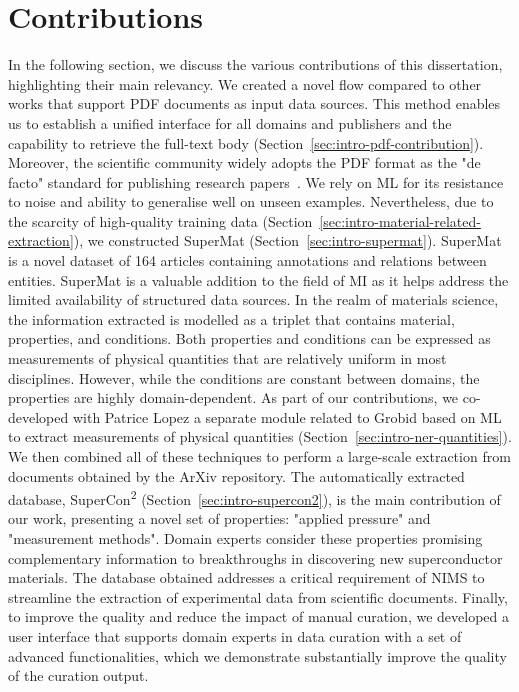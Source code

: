 \section{Contributions}
\label{sec-intro-contributions}
In the following section, we discuss the various contributions of this dissertation, highlighting their main relevancy. 
We created a novel flow compared to other works that support PDF documents as input data sources. 
This method enables us to establish a unified interface for all domains and publishers and the capability to retrieve the full-text body (Section~\ref{sec:intro-pdf-contribution}). Moreover, the scientific community widely adopts the PDF format as the "de facto" standard for publishing research papers~\cite{johnson2018pdfStatistics}.
We rely on ML for its resistance to noise and ability to generalise well on unseen examples. 
Nevertheless, due to the scarcity of high-quality training data (Section~\ref{sec:intro-material-related-extraction}), we constructed SuperMat (Section~\ref{sec:intro-supermat}). 
SuperMat is a novel dataset of 164 articles containing annotations and relations between entities. SuperMat is a valuable addition to the field of MI as it helps address the limited availability of structured data sources.
In the realm of materials science, the information extracted is modelled as a triplet that contains material, properties, and conditions. Both properties and conditions can be expressed as measurements of physical quantities that are relatively uniform in most disciplines. 
However, while the conditions are constant between domains, the properties are highly domain-dependent. As part of our contributions, we co-developed with Patrice Lopez a separate module related to Grobid based on ML to extract measurements of physical quantities (Section~\ref{sec:intro-ner-quantities}).
We then combined all of these techniques to perform a large-scale extraction from documents obtained by the ArXiv repository.
The automatically extracted database, SuperCon\textsuperscript{2} (Section~\ref{sec:intro-supercon2}), is the main contribution of our work, presenting a novel set of properties: "applied pressure" and "measurement methods".
Domain experts consider these properties promising complementary information to breakthroughs in discovering new superconductor materials.
The database obtained addresses a critical requirement of NIMS to streamline the extraction of experimental data from scientific documents.  
Finally, to improve the quality and reduce the impact of manual curation, we developed a user interface that supports domain experts in data curation with a set of advanced functionalities, which we demonstrate substantially improve the quality of the curation output. 

